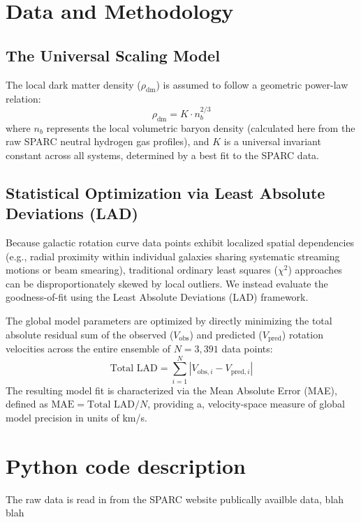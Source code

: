 \documentclass[twocolumn]{aastex631}
\begin{document}
\section{Data and Methodology} \label{sec:meth}

\subsection{The Universal Scaling Model}
The local dark matter density ($\rho_{\text{dm}}$) is assumed to follow a geometric power-law relation:
\begin{equation}
\rho_{\text{dm}} = K \cdot n_b^{2/3}
\end{equation}
where $n_b$ represents the local volumetric baryon density (calculated here from the raw SPARC neutral hydrogen gas profiles), and $K$ is a universal invariant constant across all systems, determined by a best fit to the SPARC data.  

\subsection{Statistical Optimization via Least Absolute Deviations (LAD)}
Because galactic rotation curve data points exhibit localized spatial dependencies (e.g., radial proximity within individual galaxies sharing systematic streaming motions or beam smearing), traditional ordinary least squares ($\chi^2$) approaches can be disproportionately skewed by local outliers. We instead evaluate the goodness-of-fit using the Least Absolute Deviations (LAD) framework. 

The global model parameters are optimized by directly minimizing the total absolute residual sum of the observed ($V_{\text{obs}}$) and predicted ($V_{\text{pred}}$) rotation velocities across the entire ensemble of $N = 3,391$ data points:
\begin{equation}
\text{Total LAD} = \sum_{i=1}^{N} |V_{\text{obs}, i} - V_{\text{pred}, i}|
\end{equation}
The resulting model fit is characterized via the Mean Absolute Error (MAE), defined as $\text{MAE} = \text{Total LAD} / N$, providing a, velocity-space measure of global model precision in units of km/s.

\section{Python code description} \label{sec:python}
The raw data is read in from the SPARC website publically availble data, blah blah
\end{document}
